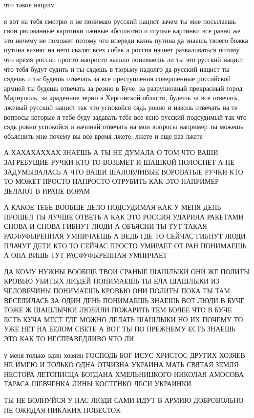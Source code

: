что такое нацизм

я вот на тебя смотрю и не понимаю русский нацист зачем ты мне посылаешь свои
рисованные картинки лживые абсолютно и глупые картинки все равно же это ничему
не поможет потому что впереди казнь путина да знаешь твоего божка путина казнят
на него свалят всех собак а россия начнет разваливаться потому что время россии
просто напросто вышло понимаешь ли ты это русский нацист что тебя будут судить
и ты сядешь в тюрьму надолго да русский нацист ты сядешь и ты будешь отвечать
за все преступления совершенные российской армией ты будешь отвечать за резню в
Буче, за разрушенный прекрасный город Мариуполь, за краденное зерно в
Херсонской области, будешь за все отвечать, лживый русский нацист так что
успокойся сядь ровно и изволь отвечать на те вопросы которые я тебе буду
задавать тебе все ясно русский подсудимый так что сядь ровно успокойся и
начинай отвечать на мои вопросы например ты можешь объяснить мне почему вы все
время лжете, лжете и еще раз лжете

А ХАХАХАХХАХ ЗНАЕШЬ А ТЫ НЕ ДУМАЛА О ТОМ ЧТО ВАШИ ЗАГРЕБУЩИЕ РУЧКИ КТО ТО
ВОЗЬМЕТ И ШАШКОЙ ПОЛОСНЕТ А НЕ ЗАДУМЫВАЛАСЬ А ЧТО ВАШИ ШАЛОВЛИВЫЕ ВОРОВАТЫЕ
РУЧКИ КТО ТО МОЖЕТ ПРОСТО НАПРОСТО ОТРУБИТЬ КАК ЭТО НАПРИМЕР ДЕЛАЮТ В ИРАНЕ
ВОРАМ

А КАКОЕ ТЕБЕ ВООБЩЕ ДЕЛО ПОДСУДИМАЯ КАК У МЕНЯ ДЕНЬ ПРОШЕЛ ТЫ ЛУЧШЕ ОТВЕТЬ А
КАК ЭТО РОССИЯ УДАРИЛА РАКЕТАМИ СНОВА И СНОВА ГИБНУТ ЛЮДИ А ОБЪЯСНИ ТЫ ТУТ
ТАКАЯ РАСФУФЫРЕННАЯ УМНИЧАЕШЬ А ВЕДЬ ГДЕ ТО СЕЙЧАС ГИБНУТ ЛЮДИ ПЛАЧУТ ДЕТИ КТО
ТО СЕЙЧАС ПРОСТО УМИРАЕТ ОТ РАН ПОНИМАЕШЬ А ОНА ВИШЬ ТУТ РАСФУФЫРЕННАЯ УМНИЧАЕТ

ДА КОМУ НУЖНЫ ВООБЩЕ ТВОИ СРАНЫЕ ШАШЛЫКИ ОНИ ЖЕ ПОЛИТЫ КРОВЬЮ УБИТЫХ ЛЮДЕЙ
ПОНИМАЕШЬ ТЫ ЕЛА ШАШЛЫКИ ИЗ ЧЕЛОВЕЧИНЫ ПОНИМАЕШЬ КРОВЬЮ ОНИ ПОЛИТЫ ПОКА ТЫ ТАМ
ВЕСЕЛИЛАСЬ ЗА ОДИН ДЕНЬ ПОНИМАЕШЬ ЗНАЕШЬ ВОТ ЛЮДИ В БУЧЕ ТОЖЕ Ж ШАШЛЫЧКИ ЛЮБИЛИ
ПОЖАРИТЬ ТЕМ БОЛЕЕ ЧТО В БУЧЕ ЕСТЬ КУЧА МЕСТ ГДЕ МОЖНО ДЕЛАТЬ ШАШЛЫКИ НО ИХ
ПОЧЕМУ ТО УЖЕ НЕТ НА БЕЛОМ СВЕТЕ А ВОТ ТЫ ПО ПРЕЖНЕМУ ЕСТЬ ЗНАЕШЬ ЭТО КАК ТО
НЕСПРАВЕДЛИВО ЧТО ЛИ

у меня только один хозяин ГОСПОДЬ БОГ ИСУС ХРИСТОС ДРУГИХ ХОЗЯЕВ НЕ ИМЕЮ И
ТОЛЬКО ОДНА ОТЧИЗНА УКРАИНА МАТЬ СВЯТАЯ ЗЕМЛЯ НЕСТОРА ЛЕТОПИСЦА БОГДАНА
ХМЕЛЬНИЦКОГО НИКОЛАЯ АМОСОВА ТАРАСА ШЕВЧЕНКА ЛИНЫ КОСТЕНКО ЛЕСИ УКРАИНКИ

ТЫ НЕ ВОЛНУЙСЯ У НАС ЛЮДИ САМИ ИДУТ В АРМИЮ ДОБРОВОЛЬНО НЕ ОЖИДАЯ НИКАКИХ
ПОВЕСТОК

